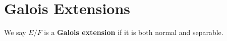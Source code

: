 \section{Galois Extensions}

We say $E/F$ is a \textbf{Galois extension} if it is both normal and separable.